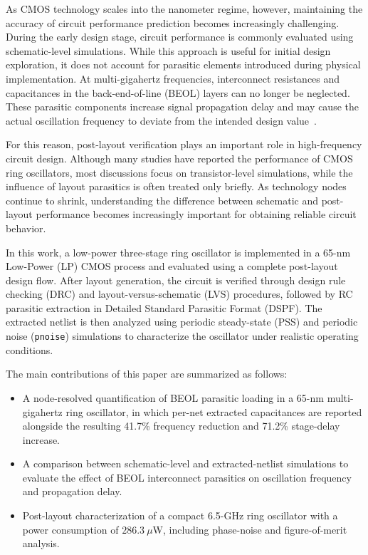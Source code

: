\documentclass[conference,a4paper]{IEEEtran} %
\begin{document}
As CMOS technology scales into the nanometer regime, however, maintaining the
accuracy of circuit performance prediction becomes increasingly challenging.
During the early design stage, circuit performance is commonly evaluated using
schematic-level simulations. While this approach is useful for initial design
exploration, it does not account for parasitic elements introduced during
physical implementation. At multi-gigahertz frequencies, interconnect
resistances and capacitances in the back-end-of-line (BEOL) layers can no longer
be neglected. These parasitic components increase signal propagation delay and
may cause the actual oscillation frequency to deviate from the intended design
value~\cite{hajimiri_ring}.

For this reason, post-layout verification plays an important role in
high-frequency circuit design. Although many studies have reported the
performance of CMOS ring oscillators, most discussions focus on transistor-level
simulations, while the influence of layout parasitics is often treated only
briefly. As technology nodes continue to shrink, understanding the difference
between schematic and post-layout performance becomes increasingly important for
obtaining reliable circuit behavior.

In this work, a low-power three-stage ring oscillator is implemented in a 65-nm
Low-Power (LP) CMOS process and evaluated using a complete post-layout design
flow. After layout generation, the circuit is verified through design rule
checking (DRC) and layout-versus-schematic (LVS) procedures, followed by RC
parasitic extraction in Detailed Standard Parasitic Format (DSPF). The extracted
netlist is then analyzed using periodic steady-state (PSS) and periodic noise
(\texttt{pnoise}) simulations to characterize the oscillator under realistic
operating conditions.

The main contributions of this paper are summarized as follows:
\begin{itemize}
\item A node-resolved quantification of BEOL parasitic loading in a 65-nm
multi-gigahertz ring oscillator, in which per-net extracted capacitances are
reported alongside the resulting 41.7\% frequency reduction and 71.2\%
stage-delay increase.
\item A comparison between schematic-level and extracted-netlist simulations to
evaluate the effect of BEOL interconnect parasitics on oscillation frequency and
propagation delay.
\item Post-layout characterization of a compact 6.5-GHz ring oscillator with a
power consumption of $286.3~\mu$W, including phase-noise and figure-of-merit
analysis.
\end{itemize}
\end{document}
